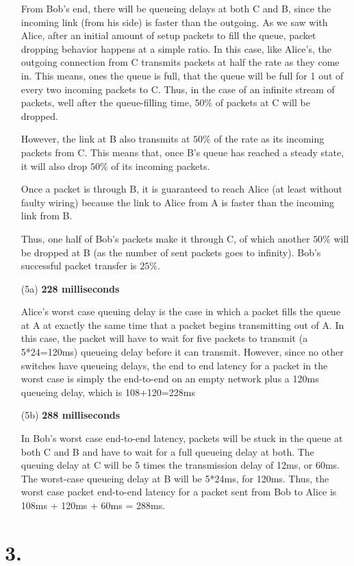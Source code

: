 \documentclass[11pt]{article}
\begin{document}
\begin{itemize}
From Bob's end, there will be queueing delays at both C and B, since the incoming link (from his side) is faster than the outgoing. As we saw with Alice, after an initial amount of setup packets to fill the queue, packet dropping behavior happens at a simple ratio. In this case, like Alice's, the outgoing connection from C transmits packets at half the rate as they come in. This means, ones the queue is full, that the queue will be full for 1 out of every two incoming packets to C. Thus, in the case of an infinite stream of packets, well after the queue-filling time, $50\%$ of packets at C will be dropped.

However, the link at B also transmits at $50\%$ of the rate as its incoming packets from C. This means that, once B's queue has reached a steady state, it will also drop $50\%$ of its incoming packets. 

Once a packet is through B, it is guaranteed to reach Alice (at least without faulty wiring) because the link to Alice from A is faster than the incoming link from B.

Thus, one half of Bob's packets make it through C, of which another $50\%$ will be dropped at B (as the number of sent packets goes to infinity). Bob's successful packet transfer is $25\%$.
\item[(5a)]\textbf{228 milliseconds}

Alice's worst case queuing delay is the case in which a packet fills the queue at A at exactly the same time that a packet begins transmitting out of A. In this case, the packet will have to wait for five packets to transmit (a 5*24=120ms) queueing delay before it can transmit. However, since no other switches have queueing delays, the end to end latency for a packet in the worst case is simply the end-to-end on an empty network plus a 120ms queueing delay, which is 108+120=228ms
\item[(5b)] \textbf{288 milliseconds}

In Bob's worst case end-to-end latency, packets will be stuck in the queue at both C and B and have to wait for a full queueing delay at both. The queuing delay at C will be 5 times the transmission delay of 12ms, or 60ms. The worst-case queueing delay at B will be 5*24ms, for 120ms. Thus, the worst case packet end-to-end latency for a packet sent from Bob to Alice is 108ms + 120ms + 60ms = 288ms.
\end{itemize}

\section*{3.}
\end{document}
